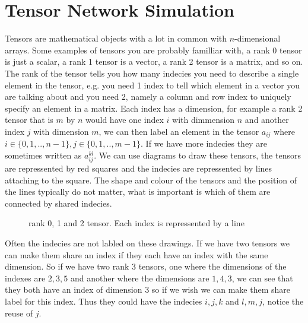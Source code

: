 \section{Tensor Network Simulation}\label{sec:tensor}
Tensors\cite{tensors} are mathematical objects with a lot in common with $n$-dimensional arrays. Some examples of tensors you are probably familliar with, a rank 0 tensor is just a scalar, a rank 1 tensor is a vector, a rank 2 tensor is a matrix, and so on. The rank of the tensor tells you how many indecies you need to describe a single element in the tensor, e.g. you need 1 index to tell which element in a vector you are talking about and you need 2, namely a column and row index to uniquely specify an element in a matrix. 
Each index has a dimension, for example a rank 2 tensor that is $m$ by $n$ would have one index $i$ with dimmension $n$ and another index $j$ with dimension $m$, we can then label an element in the tensor $a_{ij}$ where $i\in \{0,1,..,n-1\}, j\in \{0,1,..,m-1\}$. If we have more indecies they are sometimes written as $a_{ij}^{kl}$.
We can use diagrams to draw these tensors, the tensors are repressented by red squares and the indecies are repressented by lines attaching to the square. The shape and colour of the tensors and the position of the lines typically do not matter, what is important is which of them are connected by shared indecies. 

\begin{figure}[H]
    \centering 
    \caption{rank 0, 1 and 2 tensor. Each index is repressented by a line}
    \label{fig:r2t}
\end{figure}

\noindent
Often the indecies are not labled on these drawings. If we have two tensors we can make them share an index if they each have an index with the same dimension. So if we have two rank 3 tensors, one where the dimensions of the indexes are $2, 3, 5$ and another where the dimensions are $1, 4, 3$, we can see that they both have an index of dimension 3 so if we wish we can make them share label for this index. Thus they could have the indecies $i, j, k$ and $l, m, j$, notice the reuse of $j$. 

